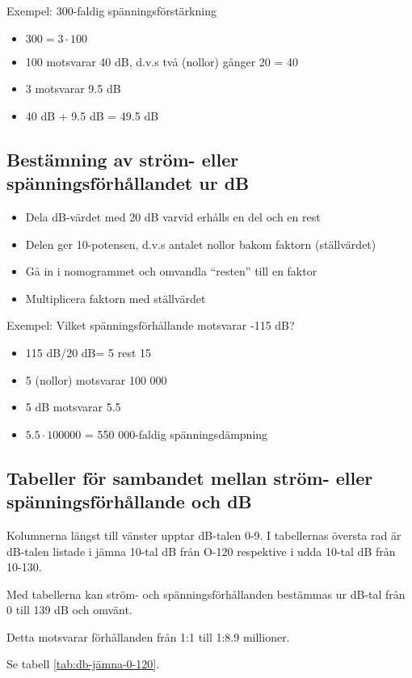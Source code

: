 Exempel: 300-faldig spänningsförstärkning
\begin{itemize}
\item \(300 = 3 \cdot 100\)
\item 100 motsvarar 40 dB, d.v.s två (nollor) gånger 20 = 40
\item 3 motsvarar 9.5 dB
\item 40 dB + 9.5 dB = 49.5 dB
\end{itemize}

\subsection{Bestämning av ström- eller spänningsförhållandet ur dB}
\begin{itemize}
\item Dela dB-värdet med 20 dB varvid erhålls en del och en rest
\item Delen ger 10-potensen, d.v.s antalet nollor bakom faktorn
  (ställvärdet)
\item Gå in i nomogrammet och omvandla ``resten'' till en faktor
\item Multiplicera faktorn med ställvärdet
\end{itemize}

Exempel: Vilket spänningsförhållande motsvarar -115 dB?
\begin{itemize}
\item 115 dB/20 dB= 5 rest 15
\item 5 (nollor) motsvarar 100 000
\item 5 dB motsvarar 5.5
\item \(5.5 \cdot 1 00 000\) = 550 000-faldig spänningsdämpning
\end{itemize}

\subsection{Tabeller för sambandet mellan ström- eller spänningsförhållande
  och dB}

Kolumnerna längst till vänster upptar dB-talen 0-9. I tabellernas
översta rad är dB-talen listade i jämna 10-tal dB från O-120
respektive i udda 10-tal dB från 10-130.

Med tabellerna kan ström- och spänningsförhållanden bestämmas ur
dB-tal från 0 till 139 dB och omvänt.

Detta motsvarar förhållanden från 1:1 till 1:8.9 millioner.

Se tabell \ref{tab:db-jämna-0-120}.


